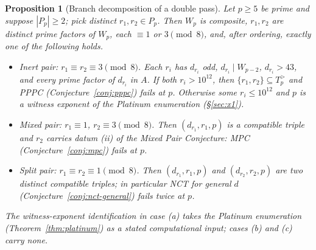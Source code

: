 \documentclass[11pt]{amsart}
\theoremstyle{plain}
\newtheorem{proposition}[theorem]{Proposition}
\theoremstyle{definition}
\theoremstyle{remark}
\numberwithin{equation}{section}
\begin{document}
\begin{proposition}[Branch decomposition of a double pass]\label{prop:branch-split}
Let $p \geq 5$ be prime and suppose $|P_p| \geq 2$; pick distinct
$r_1, r_2 \in P_p$. Then $W_p$ is composite, $r_1, r_2$ are distinct
prime factors of $W_p$, each $\equiv 1$ or $3 \pmod 8$, and, after
ordering, exactly one of the following holds.
\begin{itemize}
\item[(a)] \emph{Inert pair:} $r_1 \equiv r_2 \equiv 3 \pmod 8$. Each
$r_i$ has $d_{r_i}$ odd, $d_{r_i} \mid W_{p-2}$, $d_{r_i} > 43$, and
every prime factor of $d_{r_i}$ in $A$. If both $r_i > 10^{12}$, then
$\{r_1, r_2\} \subseteq T_p^{>}$ and PPPC (Conjecture~\ref{conj:pppc})
fails at $p$. Otherwise some $r_i \leq 10^{12}$ and $p$ is a witness
exponent of the Platinum enumeration (\S\ref{sec:x1}).
\item[(b)] \emph{Mixed pair:} $r_1 \equiv 1$, $r_2 \equiv 3 \pmod 8$.
Then $(d_{r_1}, r_1, p)$ is a compatible triple and $r_2$ carries datum
(ii) of the Mixed Pair Conjecture: MPC (Conjecture~\ref{conj:mpc})
fails at $p$.
\item[(c)] \emph{Split pair:} $r_1 \equiv r_2 \equiv 1 \pmod 8$. Then
$(d_{r_1}, r_1, p)$ and $(d_{r_2}, r_2, p)$ are two distinct compatible
triples; in particular NCT for general $d$
(Conjecture~\ref{conj:nct-general}) fails twice at $p$.
\end{itemize}
The witness-exponent identification in case (a) takes the Platinum
enumeration (Theorem~\ref{thm:platinum}) as a stated computational
input; cases (b) and (c) carry none.
\end{proposition}
\end{document}
